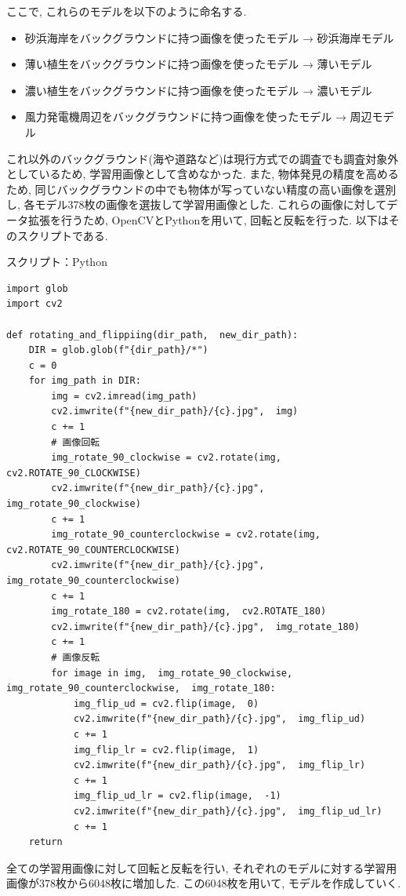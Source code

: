 \documentclass[dvipdfmx]{jsarticle}
\begin{document}
ここで, これらのモデルを以下のように命名する.
\begin{itemize}
    \item 砂浜海岸をバックグラウンドに持つ画像を使ったモデル → 砂浜海岸モデル
    \item 薄い植生をバックグラウンドに持つ画像を使ったモデル → 薄いモデル
    \item 濃い植生をバックグラウンドに持つ画像を使ったモデル → 濃いモデル
    \item 風力発電機周辺をバックグラウンドに持つ画像を使ったモデル → 周辺モデル
\end{itemize}
これ以外のバックグラウンド(海や道路など)は現行方式での調査でも調査対象外としているため, 学習用画像として含めなかった.
また, 物体発見の精度を高めるため, 同じバックグラウンドの中でも物体が写っていない精度の高い画像を選別し, 
各モデル378枚の画像を選抜して学習用画像とした.
これらの画像に対してデータ拡張を行うため, OpenCVとPythonを用いて, 回転と反転を行った.
以下はそのスクリプトである.


スクリプト：Python
\begin{lstlisting}
import glob
import cv2

def rotating_and_flippiing(dir_path,  new_dir_path):
    DIR = glob.glob(f"{dir_path}/*")
    c = 0
    for img_path in DIR:
        img = cv2.imread(img_path)
        cv2.imwrite(f"{new_dir_path}/{c}.jpg",  img)
        c += 1
        # 画像回転
        img_rotate_90_clockwise = cv2.rotate(img,  cv2.ROTATE_90_CLOCKWISE)
        cv2.imwrite(f"{new_dir_path}/{c}.jpg",  img_rotate_90_clockwise)
        c += 1
        img_rotate_90_counterclockwise = cv2.rotate(img,  cv2.ROTATE_90_COUNTERCLOCKWISE)
        cv2.imwrite(f"{new_dir_path}/{c}.jpg",  img_rotate_90_counterclockwise)
        c += 1
        img_rotate_180 = cv2.rotate(img,  cv2.ROTATE_180)
        cv2.imwrite(f"{new_dir_path}/{c}.jpg",  img_rotate_180)
        c += 1
        # 画像反転
        for image in img,  img_rotate_90_clockwise,  img_rotate_90_counterclockwise,  img_rotate_180:
            img_flip_ud = cv2.flip(image,  0)
            cv2.imwrite(f"{new_dir_path}/{c}.jpg",  img_flip_ud)
            c += 1
            img_flip_lr = cv2.flip(image,  1)
            cv2.imwrite(f"{new_dir_path}/{c}.jpg",  img_flip_lr)
            c += 1
            img_flip_ud_lr = cv2.flip(image,  -1)
            cv2.imwrite(f"{new_dir_path}/{c}.jpg",  img_flip_ud_lr)
            c += 1
    return
\end{lstlisting}

全ての学習用画像に対して回転と反転を行い, それぞれのモデルに対する学習用画像が378枚から6048枚に増加した.
この6048枚を用いて, モデルを作成していく.
\end{document}
